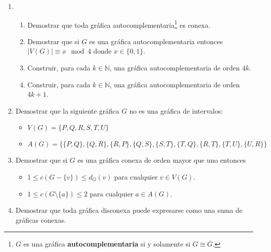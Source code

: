 \documentclass[12pt]{report}
\numberwithin{section}{chapter}
\begin{document}
\begin{enumerate}
\item 
\begin{enumerate}
\item Demostrar que toda gráfica autocomplementaria\footnote{$G$ es una gráfica \textbf{autocomplementaria} si y solamente si $G \cong \overline G$.} es conexa.

\item Demostrar que si $G$ es una gráfica autocomplementaria entonces $|V(G)| \equiv x \mod 4$ donde $x \in \{0,1\}$.

\item Construir, para cada $k \in \mathbb N$, una gráfica autocomplementaria de orden $4k$.

\item Construir, para cada $k \in \mathbb N$, una gráfica autocomplementaria de orden $4k+1$.

\end{enumerate}

\item Demostrar que la siguiente gráfica $G$ no es una gráfica de intervalos:
\begin{itemize}
\item $V(G)=\{P,Q,R,S,T,U\}$
\item $A(G) = \{\{P,Q\},\{Q,R\},\{R,P\},\{Q,S\},\{S,T\},\{T,Q\},\{R,T\},\{T,U\},\{U,R\}\}$
\end{itemize}

\item Demostrar que si $G$ es una gráfica conexa de orden mayor que uno entonces
\begin{itemize}
\item $1 \leq c(G-\{v\}) \leq d_G(v)$ para cualquier $v \in V(G)$.
\item $1 \leq c(G\setminus \{a\}) \leq 2$ para cualquier $a \in A(G)$.
\end{itemize}


\item Demostrar que toda gráfica disconexa puede expresarse como una suma de gráficas conexas.




\end{enumerate}
\end{document}
